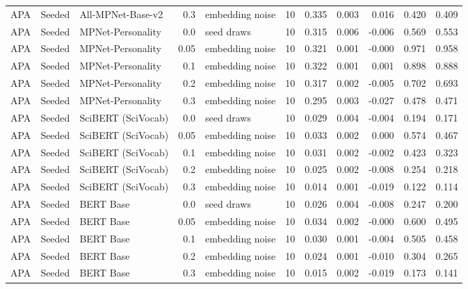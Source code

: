 \begin{table}[ht]
\begin{tabular}{lllrlrrrrrr}
APA & Seeded & All-MPNet-Base-v2 & 0.3 & embedding noise & 10 & 0.335 & 0.003 & 0.016 & 0.420 & 0.409 \\
APA & Seeded & MPNet-Personality & 0.0 & seed draws & 10 & 0.315 & 0.006 & -0.006 & 0.569 & 0.553 \\
APA & Seeded & MPNet-Personality & 0.05 & embedding noise & 10 & 0.321 & 0.001 & -0.000 & 0.971 & 0.958 \\
APA & Seeded & MPNet-Personality & 0.1 & embedding noise & 10 & 0.322 & 0.001 & 0.001 & 0.898 & 0.888 \\
APA & Seeded & MPNet-Personality & 0.2 & embedding noise & 10 & 0.317 & 0.002 & -0.005 & 0.702 & 0.693 \\
APA & Seeded & MPNet-Personality & 0.3 & embedding noise & 10 & 0.295 & 0.003 & -0.027 & 0.478 & 0.471 \\
APA & Seeded & SciBERT (SciVocab) & 0.0 & seed draws & 10 & 0.029 & 0.004 & -0.004 & 0.194 & 0.171 \\
APA & Seeded & SciBERT (SciVocab) & 0.05 & embedding noise & 10 & 0.033 & 0.002 & 0.000 & 0.574 & 0.467 \\
APA & Seeded & SciBERT (SciVocab) & 0.1 & embedding noise & 10 & 0.031 & 0.002 & -0.002 & 0.423 & 0.323 \\
APA & Seeded & SciBERT (SciVocab) & 0.2 & embedding noise & 10 & 0.025 & 0.002 & -0.008 & 0.254 & 0.218 \\
APA & Seeded & SciBERT (SciVocab) & 0.3 & embedding noise & 10 & 0.014 & 0.001 & -0.019 & 0.122 & 0.114 \\
APA & Seeded & BERT Base & 0.0 & seed draws & 10 & 0.026 & 0.004 & -0.008 & 0.247 & 0.200 \\
APA & Seeded & BERT Base & 0.05 & embedding noise & 10 & 0.034 & 0.002 & -0.000 & 0.600 & 0.495 \\
APA & Seeded & BERT Base & 0.1 & embedding noise & 10 & 0.030 & 0.001 & -0.004 & 0.505 & 0.458 \\
APA & Seeded & BERT Base & 0.2 & embedding noise & 10 & 0.024 & 0.001 & -0.010 & 0.304 & 0.265 \\
APA & Seeded & BERT Base & 0.3 & embedding noise & 10 & 0.015 & 0.002 & -0.019 & 0.173 & 0.141 \\
\bottomrule
\end{tabular}
\end{table}
